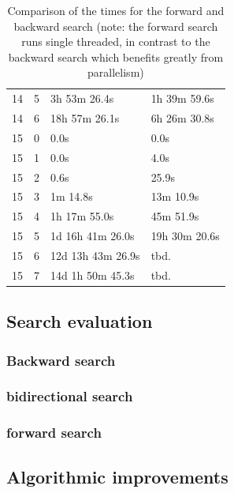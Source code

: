 \documentclass[10pt,journal,compsoc]{IEEEtran}
\begin{document}
\begin{table}[htbp]
\begin{tabular}{c|c|l|l}
    14         & 5          & 3h 53m 26.4s             & 1h 39m 59.6s              \\
    14         & 6          & 18h 57m 26.1s            & 6h 26m 30.8s              \\
    \hline
    15         & 0          & 0.0s                     & 0.0s                      \\
    15         & 1          & 0.0s                     & 4.0s                      \\
    15         & 2          & 0.6s                     & 25.9s                     \\
    15         & 3          & 1m 14.8s                 & 13m 10.9s                 \\
    15         & 4          & 1h 17m 55.0s             & 45m 51.9s                 \\
    15         & 5          & 1d 16h 41m 26.0s         & 19h 30m 20.6s             \\
    15         & 6          & 12d 13h 43m 26.9s        & tbd.                      \\
    15         & 7          & 14d 1h 50m 45.3s         & tbd.                      \\
  \end{tabular}
  \centering
  \label{tab:search_algorithms}
  \caption{Comparison of the times for the forward and backward search (note: the forward search runs single threaded, in contrast to the backward search which benefits greatly from parallelism)} %
\end{table}


\subsection{Search evaluation}
\subsubsection{Backward search}
\subsubsection{bidirectional search}
\subsubsection{forward search}

\subsection{Algorithmic improvements}
\end{document}
